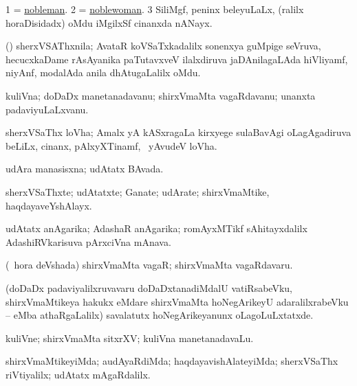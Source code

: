 \bentry
{}
\gl{\nA}
\bmng
\bnum
\num{1} = \hyperlink{nobleman}{nobleman}. 
\num{2} = \hyperlink{noblewoman}{noblewoman}. 
\num{3}  SiliMgf,  peninx beleyuLaLx, (ralilx horaDisidadx) oMdu iMgilxSf cinanxda nANayx. 
\enum
\emng
\eentry

\bentry
{}
\gl{\nA}
\bmng
(\ravi) sherxVSAThxnila; AvataR koVSaTxkadalilx sonenxya guMpige seVruva, hecucxkaDame rAsAyanika paTutavxveV ilalxdiruva jaDAnilagaLAda hiVliyamf, niyAnf, modalAda anila dhAtugaLalilx oMdu. 
\emng
\eentry

\bentry
{}
\gl{\nA}
\bmng
kuliVna; doDaDx manetanadavanu; shirxVmaMta vagaRdavanu; unanxta padaviyuLaLxvanu. 
\emng
\eentry

\bentry
{}
\gl{\nA}
\bmng
sherxVSaThx loVha; Amalx yA kASxragaLa kirxyege sulaBavAgi oLagAgadiruva beLiLx, cinanx, pAlxyXTinamf, \mo\ yAvudeV loVha. 
\emng
\eentry

\bentry
{}
\gl{\gu}
\bmng
udAra manasisxna; udAtatx BAvada. 
\emng
\eentry

\bentry
{}
\gl{\nA}
\bmng
sherxVSaThxte; udAtatxte; Ganate; udArate; shirxVmaMtike, haqdayaveYshAlayx. 
\emng
\eentry

\bentry
{}
\gl{\nA}
\bmng
udAtatx anAgarika; AdashaR anAgarika; romAyxMTikf sAhitayxdalilx AdashiRVkarisuva pArxciVna mAnava. 
\emng
\eentry

\bentry
{}
\gl{\nA}
\expl{\F}
\bmng
(\kanmu\ hora deVshada) shirxVmaMta vagaR; shirxVmaMta vagaRdavaru. 
\emng
\eentry

\bentry
{}
\gl{\nA}
\expl{\F}
\bmng
(doDaDx padaviyalilxruvavaru doDaDxtanadiMdalU vatiRsabeVku, shirxVmaMtikeya hakukx eMdare shirxVmaMta hoNegArikeyU adaralilxrabeVku -- eMba athaRgaLalilx) savalatutx hoNegArikeyanunx oLagoLuLxtatxde. 
\emng
\eentry

\bentry
{}
\gl{\nA}
\bmng
kuliVne; shirxVmaMta sitxrXV; kuliVna manetanadavaLu. 
\emng
\eentry

\bentry
{}
\gl{\kirxvi}
\bmng
shirxVmaMtikeyiMda; audAyaRdiMda; haqdayavishAlateyiMda; sherxVSaThx riVtiyalilx; udAtatx mAgaRdalilx. 
\emng
\eentry

